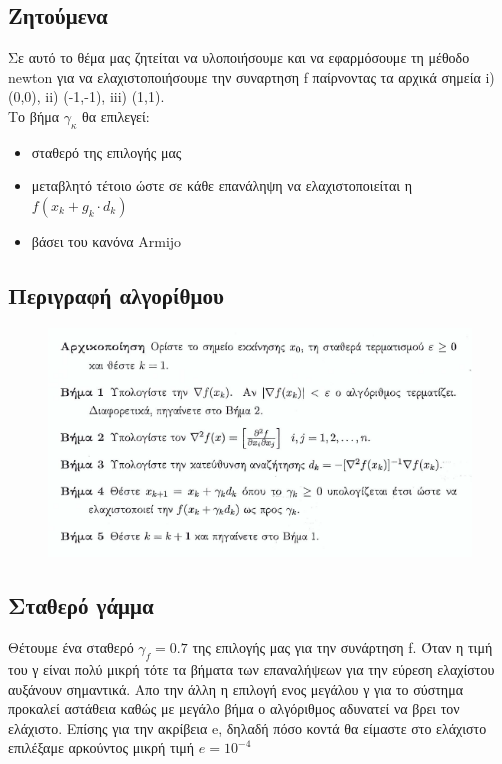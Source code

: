 \documentclass{article}
\begin{document}
\subsection*{Ζητούμενα}
Σε αυτό το θέμα μας ζητείται να υλοποιήσουμε και να εφαρμόσουμε τη μέθοδο newton για να ελαχιστοποιήσουμε την συναρτηση f  παίρνοντας τα αρχικά σημεία i) (0,0), ii) (-1,-1), iii) (1,1).\\Το βήμα $γ_κ$ θα επιλεγεί:
\begin{itemize}
\item σταθερό της επιλογής μας
\item μεταβλητό τέτοιο ώστε σε κάθε επανάληψη να ελαχιστοποιείται η $f(x_k+g_k \cdot d_k )$ 
\item  βάσει του κανόνα Armijo
\end{itemize}
\subsection*{Περιγραφή αλγορίθμου}
\begin{figure}[h!]	
     \centering  
     \advance\leftskip-0.2cm  
  \includegraphics[width=130mm,scale=2]{desc2.png}
\end{figure} 
\subsection*{Σταθερό γάμμα}
Θέτουμε ένα σταθερό $\boxed{γ_f=0.7}$ της επιλογής μας για την συνάρτηση f.  Όταν η τιμή του γ είναι πολύ μικρή τότε τα βήματα των επαναλήψεων για την εύρεση ελαχίστου αυξάνουν σημαντικά. Απο την άλλη η επιλογή ενος μεγάλου γ για το σύστημα προκαλεί αστάθεια καθώς με μεγάλο βήμα ο αλγόριθμος αδυνατεί να βρει τον ελάχιστο. Επίσης για την ακρίβεια e, δηλαδή πόσο κοντά θα είμαστε στο ελάχιστο επιλέξαμε αρκούντος μικρή τιμή $\boxed{e = 10^{-4}}$
\clearpage
\end{document}
